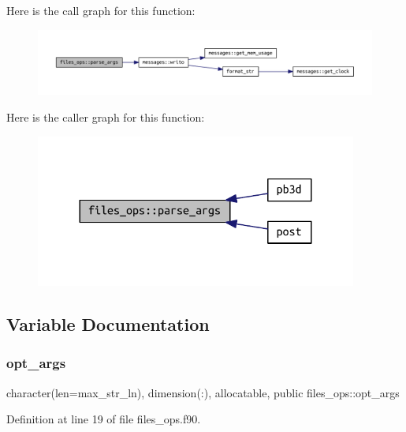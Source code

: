 Here is the call graph for this function\+:
\nopagebreak
\begin{figure}[H]
\begin{center}
\leavevmode
\includegraphics[width=350pt]{namespacefiles__ops_a051584112f6e4f6e60b0ef824dffbf5e_cgraph}
\end{center}
\end{figure}
Here is the caller graph for this function\+:
\nopagebreak
\begin{figure}[H]
\begin{center}
\leavevmode
\includegraphics[width=300pt]{namespacefiles__ops_a051584112f6e4f6e60b0ef824dffbf5e_icgraph}
\end{center}
\end{figure}


\subsection{Variable Documentation}
\mbox{\label{namespacefiles__ops_a0666bcbf3aa6a9969e6dc563a40e7152}} 
\subsubsection{\texorpdfstring{opt\+\_\+args}{opt\_args}}
{\footnotesize\ttfamily character(len=max\+\_\+str\+\_\+ln), dimension(\+:), allocatable, public files\+\_\+ops\+::opt\+\_\+args}



Definition at line 19 of file files\+\_\+ops.\+f90.

